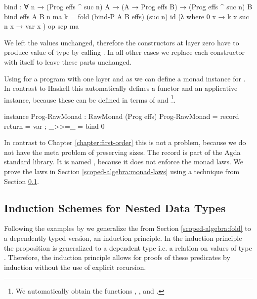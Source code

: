 \begin{code}
bind : ∀ n → (Prog effs ^ suc n) A → (A → Prog effs B) →
  (Prog effs ^ suc n) B
bind {effs} {A} {B} n ma k = fold (bind-P A B effs) (suc n) id (λ where
    {0}      x → k x
    {suc n}  x → var x
  ) op scp ma
\end{code}
We left the values unchanged, therefore the 
constructors at layer zero have to produce value of type
\AgdaSpace{}\AgdaSpace{}
by calling .
In all other cases we replace each constructor with itself to leave these parts
unchanged.

Using \AgdaFunction{>>=} for a program with one layer and
 as  we can define a monad
instance for \AgdaSpace{}.
In contrast to Haskell this automatically defines a functor and an applicative
instance, because these can be defined in terms of \AgdaFunction{>>=} and
\footnote{We automatically obtain the functions
  \AgdaFunction{<\$>}, \AgdaFunction{<*>},  and
  \AgdaFunction{>>}. }.
\begin{code}
instance
  Prog-RawMonad : RawMonad (Prog effs)
  Prog-RawMonad = record { return = var ; _>>=_ = bind 0 }
\end{code}
In contrast to Chapter \ref{chapter:first-order} this is not a problem, because
we do not have the meta problem of preserving sizes.
The record is part of the Agda standard library.
It is named , because it does not enforce the monad laws.
We prove the laws in Section \ref{scoped-algebra:monad-laws} using
a technique from Section \ref{scoped-algebra:ind}.


\subsection{Induction Schemes for Nested Data Types}
\label{scoped-algebra:ind}

Following the examples by \textcite{DBLP:journals/corr/abs-1806-05230} we
generalize the  from Section \ref{scoped-algebra:fold} to a
dependently typed version, an induction principle.
In the induction principle the proposition  is generalized to a
dependent type i.e. a relation on values of type 
\AgdaSpace{}\AgdaSpace{}.
Therefore, the induction principle allows for proofs of these predicates by
induction without the use of explicit recursion.

